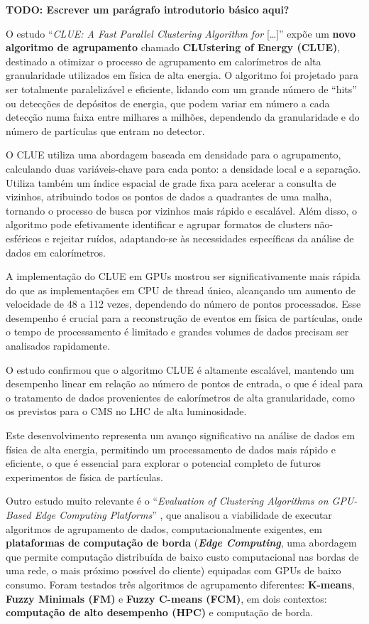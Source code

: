 \documentclass[12pt,
openright, 
oneside, %
a4paper,    %
brazil]{facom-ufu-abntex2}
\begin{document}
\textbf{TODO: Escrever um parágrafo introdutorio básico aqui?}


O estudo \enquote{\textit{CLUE: A Fast Parallel Clustering Algorithm for} [\dots]} \cite{clueParallelAlgo2020} expõe um \textbf{novo algoritmo de agrupamento} chamado \textbf{CLUstering of Energy (CLUE)}, destinado a otimizar o processo de agrupamento em calorímetros de alta granularidade utilizados em física de alta energia. O algoritmo foi projetado para ser totalmente paralelizável e eficiente, lidando com um grande número de \enquote{hits} ou detecções de depósitos de energia, que podem variar em número a cada detecção numa faixa entre milhares a milhões, dependendo da granularidade e do número de partículas que entram no detector.

O CLUE utiliza uma abordagem baseada em densidade para o agrupamento, calculando duas variáveis-chave para cada ponto: a densidade local e a separação. Utiliza também um índice espacial de grade fixa para acelerar a consulta de vizinhos, atribuindo todos os pontos de dados a quadrantes de uma malha, tornando o processo de busca por vizinhos mais rápido e escalável. Além disso, o algoritmo pode efetivamente identificar e agrupar formatos de clusters não-esféricos e rejeitar ruídos, adaptando-se às necessidades específicas da análise de dados em calorímetros.

A implementação do CLUE em GPUs mostrou ser significativamente mais rápida do que as implementações em CPU de thread único, alcançando um aumento de velocidade de 48 a 112 vezes, dependendo do número de pontos processados. Esse desempenho é crucial para a reconstrução de eventos em física de partículas, onde o tempo de processamento é limitado e grandes volumes de dados precisam ser analisados rapidamente.

O estudo confirmou que o algoritmo CLUE é altamente escalável, mantendo um desempenho linear em relação ao número de pontos de entrada, o que é ideal para o tratamento de dados provenientes de calorímetros de alta granularidade, como os previstos para o CMS no LHC de alta luminosidade.

Este desenvolvimento representa um avanço significativo na análise de dados em física de alta energia, permitindo um processamento de dados mais rápido e eficiente, o que é essencial para explorar o potencial completo de futuros experimentos de física de partículas.

Outro estudo muito relevante é o \enquote{\textit{Evaluation of Clustering Algorithms on GPU-Based Edge Computing Platforms}} \cite{edgeComputingGPUsIOT2020}, que analisou a viabilidade de executar algoritmos de agrupamento de dados, computacionalmente exigentes, em \textbf{plataformas de computação de borda} (\textbf{\textit{Edge Computing}}, uma abordagem que permite computação distribuída de baixo custo computacional nas bordas de uma rede, o mais próximo possível do cliente) equipadas com GPUs de baixo consumo. Foram testados três algoritmos de agrupamento diferentes: \textbf{K-means}, \textbf{Fuzzy Minimals (FM)} e \textbf{Fuzzy C-means (FCM)}, em dois contextos: \textbf{computação de alto desempenho (HPC)} e computação de borda.
\end{document}
